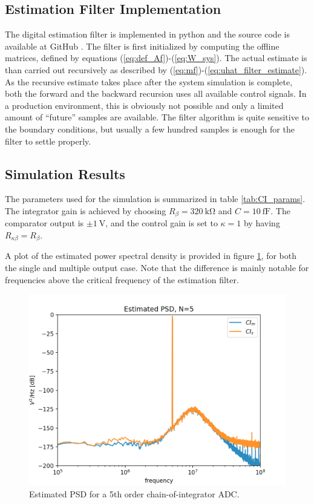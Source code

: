\subsection{Estimation Filter Implementation}
The digital estimation filter is implemented in python and the source code is available at GitHub \cite{cbadcsim2}. The filter is first initialized by computing the offline matrices, defined by equations (\ref{eq:def_Af})-(\ref{eq:W_sys}). The actual estimate is than carried out recursively as described by (\ref{eq:mf})-(\ref{eq:uhat_filter_estimate}). As the recursive estimate takes place after the system simulation is complete, both the forward and the backward recursion uses all available control signals. In a production environment, this is obviously not possible and only a limited amount of \enquote{future} samples are available. The filter algorithm is quite sensitive to the boundary conditions, but usually a few hundred samples is enough for the filter to settle properly.

\subsection{Simulation Results}
The parameters used for the simulation is summarized in table \ref{tab:CI_params}. The integrator gain is achieved by choosing $R_{\beta} = \SI{320}{\kilo\ohm}$ and $C = \SI{10}{\femto\farad}$. The comparator output is $\pm \SI{1}{\volt}$, and the control gain is set to $\kappa=1$ by having $R_{\kappa\beta} = R_\beta$.


A plot of the estimated power spectral density is provided in figure \ref{fig:CI_sim_N5}, for both the single and multiple output case. Note that the difference is mainly notable for frequencies above the critical frequency of the estimation filter.
\begin{figure}
    \centering
    \includegraphics[width=\linewidth]{figures/051chain/CI_sim_N5.png}
    \caption{Estimated PSD for a 5th order chain-of-integrator ADC.}
    \label{fig:CI_sim_N5}
\end{figure}

